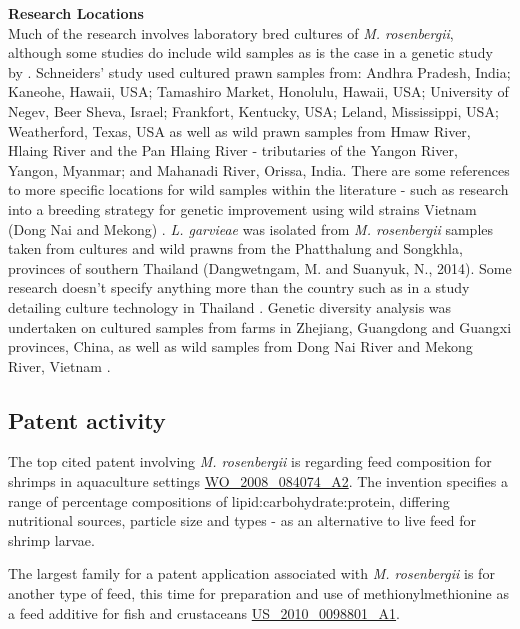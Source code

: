 \documentclass[]{book}
\theoremstyle{definition}
\theoremstyle{definition}
\theoremstyle{definition}
\theoremstyle{remark}
\begin{document}
\textbf{Research Locations}\\
Much of the research involves laboratory bred cultures of \emph{M.
rosenbergii}, although some studies do include wild samples as is the
case in a genetic study by \citeauthor{Schneider_2012}
\citetext{\citeyear{Schneider_2012}; \citealp{Schneider_2012}}.
Schneiders' study used cultured prawn samples from: Andhra Pradesh,
India; Kaneohe, Hawaii, USA; Tamashiro Market, Honolulu, Hawaii, USA;
University of Negev, Beer Sheva, Israel; Frankfort, Kentucky, USA;
Leland, Mississippi, USA; Weatherford, Texas, USA as well as wild prawn
samples from Hmaw River, Hlaing River and the Pan Hlaing River -
tributaries of the Yangon River, Yangon, Myanmar; and Mahanadi River,
Orissa, India. There are some references to more specific locations for
wild samples within the literature - such as research into a breeding
strategy for genetic improvement using wild strains Vietnam (Dong Nai
and Mekong) \citep{Thanh_2010, Tidwell_2014}. \emph{L. garvieae} was
isolated from \emph{M. rosenbergii} samples taken from cultures and wild
prawns from the Phatthalung and Songkhla, provinces of southern Thailand
(Dangwetngam, M. and Suanyuk, N., 2014). Some research doesn't specify
anything more than the country such as in a study detailing culture
technology in Thailand \citep{Na_Nakorn_2012}. Genetic diversity
analysis was undertaken on cultured samples from farms in Zhejiang,
Guangdong and Guangxi provinces, China, as well as wild samples from
Dong Nai River and Mekong River, Vietnam \citep{Nguyen_Thanh_2015}.

\hypertarget{patent-activity-3}{%
\subsection{Patent activity}\label{patent-activity-3}}

The top cited patent involving \emph{M. rosenbergii} is regarding feed
composition for shrimps in aquaculture settings
\href{https://www.lens.org/lens/patent/WO_2008_084074_A2}{WO\_2008\_084074\_A2}.
The invention specifies a range of percentage compositions of
lipid:carbohydrate:protein, differing nutritional sources, particle size
and types - as an alternative to live feed for shrimp larvae.

The largest family for a patent application associated with \emph{M.
rosenbergii} is for another type of feed, this time for preparation and
use of methionylmethionine as a feed additive for fish and crustaceans
\href{https://www.lens.org/lens/patent/US_2010_0098801_A1}{US\_2010\_0098801\_A1}.
\end{document}
